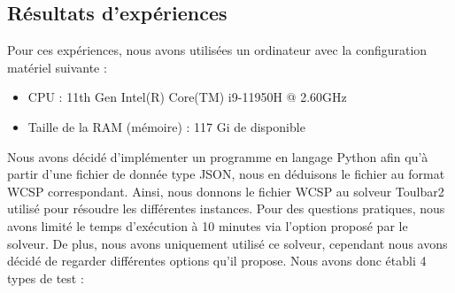 \documentclass[a4paper, 10pt]{article}
\begin{document}
    \subsection{Résultats d'expériences}
      Pour ces expériences, nous avons utilisées un ordinateur avec la configuration matériel suivante :
      \begin{itemize}
        \item CPU : 11th Gen Intel(R) Core(TM) i9-11950H @ 2.60GHz
        \item Taille de la RAM (mémoire) : 117 Gi de disponible
      \end{itemize}

      Nous avons décidé d'implémenter un programme en langage Python afin qu'à partir d'une fichier de donnée type JSON, nous en déduisons le fichier au format WCSP correspondant. Ainsi, nous donnons le fichier WCSP au solveur Toulbar2 utilisé pour résoudre les différentes instances. Pour des questions pratiques, nous avons limité le temps d'exécution à 10 minutes via l'option proposé par le solveur. De plus, nous avons uniquement utilisé ce solveur, cependant nous avons décidé de regarder différentes options qu'il propose. Nous avons donc établi 4 types de test :
\end{document}
